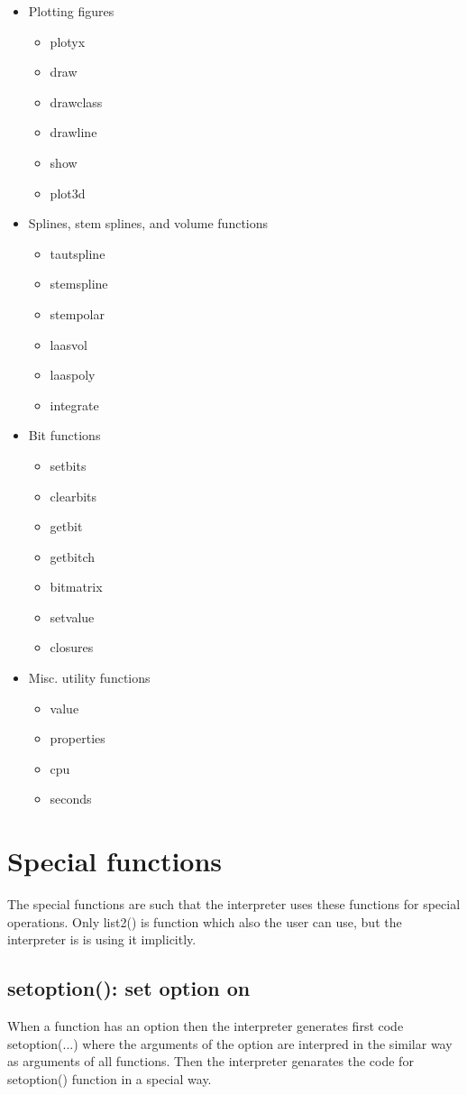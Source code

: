 \begin{itemize}
\begin{itemize}
\end{itemize}
\item Plotting figures
\begin{itemize}
\item plotyx
\item draw
\item drawclass
\item drawline
\item show
\item plot3d
\end{itemize}
\item Splines, stem splines,  and volume functions
\begin{itemize}
\item tautspline
\item stemspline
\item stempolar
\item laasvol
\item laaspoly
\item integrate
\end{itemize}
\item Bit functions
\begin{itemize}
\item setbits
\item clearbits
\item getbit
\item getbitch
\item bitmatrix
\item setvalue
\item closures
\end{itemize}
\item  Misc. utility functions
\begin{itemize}
\item value
\item properties
\item cpu
\item seconds
\end{itemize}
\end{itemize}
\section{Special functions}
\label{special}
The special functions are such that the interpreter uses these functions for special operations.
Only \textcolor{VioletRed}{list2}() is function which also the user can use, but the interpreter is
is using it implicitly.
\subsection{\textcolor{VioletRed}{setoption}(): set option on}
\label{setoption}
When a function has an option then the interpreter generates first code
\textcolor{VioletRed}{setoption}(...) where the arguments of the option are interpred in the similar way as
arguments of all functions. Then the interpreter genarates the code for
\textcolor{VioletRed}{setoption}() function in a special way.
